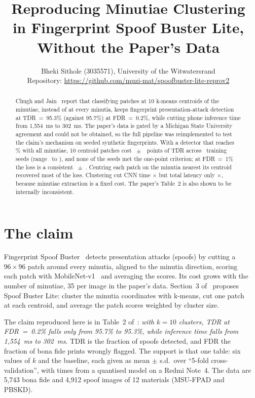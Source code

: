 \IfFileExists{IEEEtran.cls}{\documentclass[conference]{IEEEtran}}{\documentclass[twocolumn,10pt]{article}}
\begin{document}
\title{Reproducing Minutiae Clustering in Fingerprint Spoof Buster Lite, Without the Paper's Data}
\author{Bheki Sithole (3035571), University of the Witwatersrand\\
Repository: \url{https://github.com/muzi-mat/spoofbuster-lite-reprov2}}
\maketitle

\begin{abstract}
Chugh and Jain~\cite{chugh2019} report that classifying patches at 10 k-means centroids of the minutiae,
instead of at every minutia, keeps fingerprint presentation-attack detection at TDR~=~95.3\% (against
95.7\%) at FDR~=~0.2\%, while cutting phone inference time from 1,554~ms to 302~ms. The paper's data is
gated by a Michigan State University agreement and could not be obtained, so the full pipeline was
reimplemented to test the claim's mechanism on seeded synthetic fingerprints. With a detector that reaches \TDRall\% with all minutiae,
10 centroid patches cost \DeltaSeedsMean~$\pm$~\DeltaSeedsSD\ points of TDR across \NSeeds\ training seeds
(range \DeltaSeedsMin\ to \DeltaSeedsMax), and none of the seeds met the one-point criterion; at
FDR~=~1\% the loss is a consistent \DeltaOneSeedsMean~$\pm$~\DeltaOneSeedsSD. Centring each patch on the
minutia nearest its centroid recovered most of the loss. Clustering cut CNN time \SpeedupCNN$\times$ but
total latency only \SpeedupTotal$\times$, because minutiae extraction is a fixed cost. The paper's
Table~2 is also shown to be internally inconsistent.
\end{abstract}

\section{The claim}
Fingerprint Spoof Buster~\cite{chugh2018} detects presentation attacks (spoofs) by cutting a
$96\times96$ patch around every minutia, aligned to the minutia direction, scoring each patch with
MobileNet-v1~\cite{howard2017} and averaging the scores. Its cost grows with the number of minutiae, 35
per image in the paper's data. Section~3 of~\cite{chugh2019} proposes Spoof Buster Lite: cluster the
minutia coordinates with k-means, cut one patch at each centroid, and average the patch scores weighted
by cluster size.

The claim reproduced here is in Table~2 of~\cite{chugh2019}: \emph{with $k=10$ clusters, TDR at
FDR~=~0.2\% falls only from 95.7\% to 95.3\%, while inference time falls from 1,554~ms to 302~ms.} TDR is
the fraction of spoofs detected, and FDR the fraction of bona fide prints wrongly flagged. The support
is that one table: six values of $k$ and the baseline, each given as mean $\pm$ s.d.\ over ``5-fold
cross-validation'', with times from a quantised model on a Redmi Note~4. The data are 5,743 bona fide
and 4,912 spoof images of 12 materials (MSU-FPAD and PBSKD).
\end{document}
